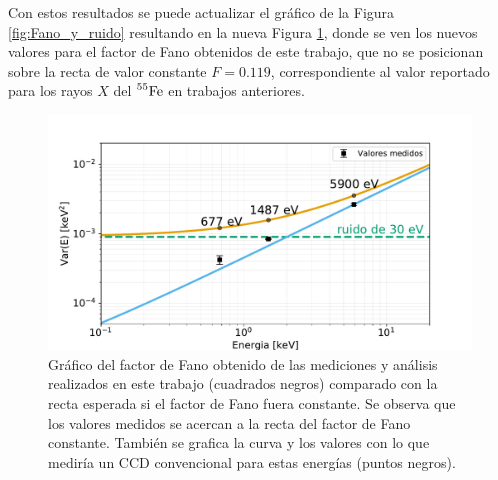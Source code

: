 Con estos resultados se puede actualizar el gráfico de la Figura \ref{fig:Fano_y_ruido} resultando en la nueva Figura \ref{fig:Fano_y_ruido_final}, donde se ven los nuevos valores para el factor de Fano obtenidos de este trabajo, que no se posicionan sobre la recta de valor constante $F = 0.119$, correspondiente al valor reportado para los rayos $X$ del $\prescript{55}{}{\mbox{Fe}}$ en trabajos anteriores\cite{Rodrigues}.
\begin{figure}[H]
    \centering
        \includegraphics[scale=0.5]{Figs/FanoyRuidoFinal.pdf}
    \caption{Gráfico del factor de Fano obtenido de las mediciones y análisis realizados en este trabajo (cuadrados negros) comparado con la recta esperada si el factor de Fano fuera constante. Se observa que los valores medidos se acercan a la recta del factor de Fano constante. También se grafica la curva y los valores con lo que mediría un CCD convencional para estas energías (puntos negros).}
    \label{fig:Fano_y_ruido_final}
\end{figure}